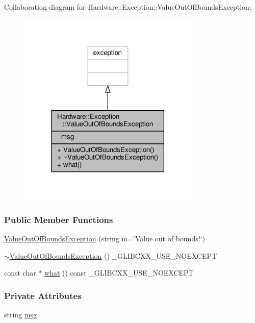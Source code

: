 Collaboration diagram for Hardware\+:\+:Exception\+:\+:Value\+Out\+Of\+Bounds\+Exception\+:
\nopagebreak
\begin{figure}[H]
\begin{center}
\leavevmode
\includegraphics[width=245pt]{class_hardware_1_1_exception_1_1_value_out_of_bounds_exception__coll__graph}
\end{center}
\end{figure}
\subsubsection*{Public Member Functions}
\begin{DoxyCompactItemize}
\item 
\hyperlink{class_hardware_1_1_exception_1_1_value_out_of_bounds_exception_a1756ccdc56400b77e1f085df854738e4}{Value\+Out\+Of\+Bounds\+Exception} (string m=\char`\"{}Value out of bounds!\char`\"{})
\item 
\hyperlink{class_hardware_1_1_exception_1_1_value_out_of_bounds_exception_ac94abda1653cca6c85a936e46e0d0424}{$\sim$\+Value\+Out\+Of\+Bounds\+Exception} () \+\_\+\+G\+L\+I\+B\+C\+X\+X\+\_\+\+U\+S\+E\+\_\+\+N\+O\+E\+X\+C\+E\+P\+T
\item 
const char $\ast$ \hyperlink{class_hardware_1_1_exception_1_1_value_out_of_bounds_exception_a2c3892baec3ab92f686b31c5f15b59b2}{what} () const \+\_\+\+G\+L\+I\+B\+C\+X\+X\+\_\+\+U\+S\+E\+\_\+\+N\+O\+E\+X\+C\+E\+P\+T
\end{DoxyCompactItemize}
\subsubsection*{Private Attributes}
\begin{DoxyCompactItemize}
\item 
string \hyperlink{class_hardware_1_1_exception_1_1_value_out_of_bounds_exception_a9a118d00116fbc47c0eaa7e502a8ea68}{msg}
\end{DoxyCompactItemize}


